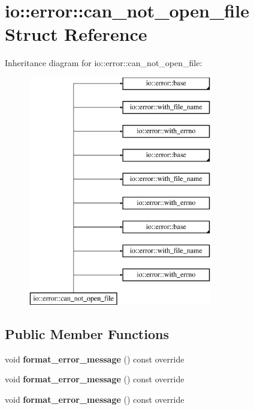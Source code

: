 \hypertarget{structio_1_1error_1_1can__not__open__file}{}\section{io\+:\+:error\+:\+:can\+\_\+not\+\_\+open\+\_\+file Struct Reference}
\label{structio_1_1error_1_1can__not__open__file}
Inheritance diagram for io\+:\+:error\+:\+:can\+\_\+not\+\_\+open\+\_\+file\+:\begin{figure}[H]
\begin{center}
\leavevmode
\includegraphics[height=10.000000cm]{d4/dbd/structio_1_1error_1_1can__not__open__file}
\end{center}
\end{figure}
\subsection*{Public Member Functions}
\begin{DoxyCompactItemize}
\item 
\mbox{\label{structio_1_1error_1_1can__not__open__file_a60abbeaffed9d0a354cfff5bccfab1d6}} 
void {\bfseries format\+\_\+error\+\_\+message} () const override
\item 
\mbox{\label{structio_1_1error_1_1can__not__open__file_a60abbeaffed9d0a354cfff5bccfab1d6}} 
void {\bfseries format\+\_\+error\+\_\+message} () const override
\item 
\mbox{\label{structio_1_1error_1_1can__not__open__file_a60abbeaffed9d0a354cfff5bccfab1d6}} 
void {\bfseries format\+\_\+error\+\_\+message} () const override
\end{DoxyCompactItemize}
